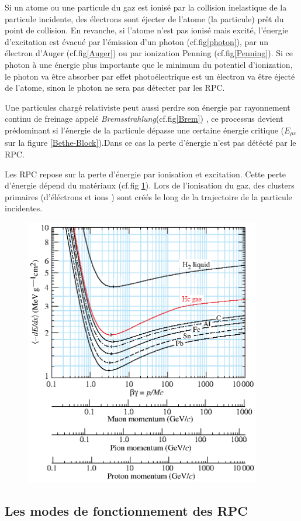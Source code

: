 Si un atome ou une particule du gaz est ionisé par la collision inelastique de la particule incidente, des électrons sont éjecter de l'atome (la particule) prêt du point de collision. En revanche, si l'atome n'est pas ionisé mais excité, l'énergie d'excitation est évacué par l'émission d'un photon (cf.fig\ref{photon}), par un électron d'Auger (cf.fig\ref{Auger}) ou par ionization Penning (cf.fig\ref{Penning}). Si ce photon à une énergie plus importante que le minimum du potentiel d'ionization, le photon va être absorber par effet photoélectrique est un électron va être éjecté de l'atome, sinon le photon ne sera pas détecter par les RPC.

Une particules chargé relativiste peut aussi perdre son énergie par rayonnement continu de freinage appelé \textit{Bremsstrahlung}(cf.fig\ref{Brem}) , ce processus devient prédominant si l'énergie de la particule dépasse une certaine énergie critique ($E_{\mu c}$ sur la figure \ref{Bethe-Block}).Dans ce cas la perte d'énergie n'est pas détécté par le RPC.

Les RPC repose sur la perte d'énergie par ionisation et excitation. Cette perte d'énergie dépend du matériaux (cf.fig \ref{mat}). Lors de l'ionisation du gaz, des clusters primaires (d'éléctrons et ions ) sont créés le long de la trajectoire de la particule incidentes. 


\begin{figure}[h!]
	\centering
	\includegraphics[width=0.92\textwidth]{RPC/energylost.eps}
	\label{mat}
\end{figure}

\subsection{Les modes de fonctionnement des RPC}


